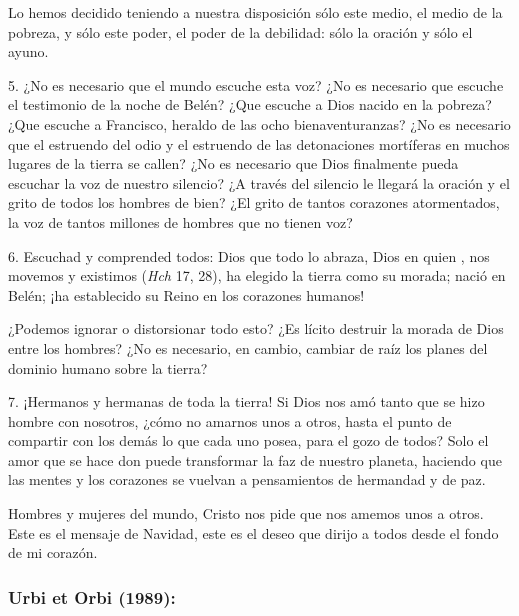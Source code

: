 \begin{body}
	Lo hemos decidido teniendo a nuestra disposición sólo este medio, el medio de la pobreza, y sólo este poder, el poder de la debilidad: sólo la oración y sólo el ayuno.
	
	5. ¿No es necesario que el mundo escuche esta voz? ¿No es necesario que escuche el testimonio de la noche de Belén? ¿Que escuche a Dios nacido en la pobreza? ¿Que escuche a Francisco, heraldo de las ocho bienaventuranzas? ¿No es necesario que el estruendo del odio y el estruendo de las detonaciones mortíferas en muchos lugares de la tierra se callen? ¿No es necesario que Dios finalmente pueda escuchar la voz de nuestro silencio? ¿A través del silencio le llegará la oración y el grito de todos los hombres de bien? ¿El grito de tantos corazones atormentados, la voz de tantos millones de hombres que no tienen voz?
	
	6. Escuchad y comprended todos: Dios que todo lo abraza, Dios en quien , nos movemos y existimos (\emph{Hch} 17, 28), ha elegido la tierra como su morada; nació en Belén; ¡ha establecido su Reino en los corazones humanos!
	
	¿Podemos ignorar o distorsionar todo esto? ¿Es lícito destruir la morada de Dios entre los hombres? ¿No es necesario, en cambio, cambiar de raíz los planes del dominio humano sobre la tierra?
	
	7. ¡Hermanos y hermanas de toda la tierra! Si Dios nos amó tanto que se hizo hombre con nosotros, ¿cómo no amarnos unos a otros, hasta el punto de compartir con los demás lo que cada uno posea, para el gozo de todos? Solo el amor que se hace don puede transformar la faz de nuestro planeta, haciendo que las mentes y los corazones se vuelvan a pensamientos de hermandad y de paz.
	
	Hombres y mujeres del mundo, Cristo nos pide que nos amemos unos a otros. Este es el mensaje de Navidad, este es el deseo que dirijo a todos desde el fondo de mi corazón.
\end{body}


\subsubsection{Urbi et Orbi (1989):}

